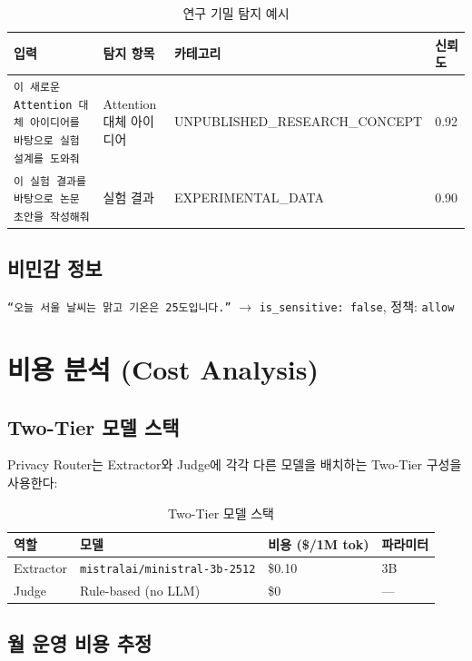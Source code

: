 \documentclass[11pt,a4paper]{article}
\begin{document}
\begin{table}[h]
\centering
\begin{tabular}{@{}p{5cm}lll@{}}
\toprule
입력 & 탐지 항목 & 카테고리 & 신뢰도 \\
\midrule
\texttt{이 새로운 Attention 대체 아이디어를 바탕으로 실험 설계를 도와줘} & Attention 대체 아이디어 & UNPUBLISHED\_RESEARCH\_CONCEPT & 0.92 \\
\texttt{이 실험 결과를 바탕으로 논문 초안을 작성해줘} & 실험 결과 & EXPERIMENTAL\_DATA & 0.90 \\
\bottomrule
\end{tabular}
\caption{연구 기밀 탐지 예시}
\end{table}

\subsection{비민감 정보}

\texttt{``오늘 서울 날씨는 맑고 기온은 25도입니다.''} $\rightarrow$ \texttt{is\_sensitive: false}, 정책: \texttt{allow}

\section{비용 분석 (Cost Analysis)}

\subsection{Two-Tier 모델 스택}

Privacy Router는 Extractor와 Judge에 각각 다른 모델을 배치하는 Two-Tier 구성을 사용한다:

\begin{table}[h]
\centering
\begin{tabular}{@{}llll@{}}
\toprule
역할 & 모델 & 비용 (\$/1M tok) & 파라미터 \\
\midrule
Extractor & \texttt{mistralai/ministral-3b-2512} & \$0.10 & 3B \\
Judge & Rule-based (no LLM) & \$0 & --- \\
\bottomrule
\end{tabular}
\caption{Two-Tier 모델 스택}
\end{table}

\subsection{월 운영 비용 추정}
\end{document}

